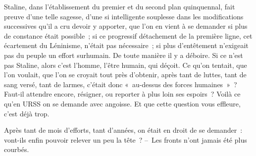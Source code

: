 \documentclass[twoside]{book} %
\newcommand{\astermono}{\medskip\centerline{\color{rubric}\large\selectfont{\syms ✻}}\medskip\par}%
\begin{document}
\astermono

\noindent Staline, dans l’établissement du premier et du second plan quinquennal, fait preuve d’une telle sagesse, d’une si intelligente souplesse dans les modifications successives qu’il a cru devoir y apporter, que l’on en vient à se demander si plus de constance était possible ; si ce progressif détachement de la première ligne, cet écartement du Léninisme, n’était pas nécessaire ; si plus d’entêtement n’exigeait pas du peuple un effort surhumain. De toute manière il y a déboire. Si ce n’est pas Staline, alors c’est l’homme, l’être humain, qui déçoit. Ce qu’on tentait, que l’on voulait, que l’on se croyait tout près d’obtenir, après tant de luttes, tant de sang versé, tant de larmes, c’était donc « au-dessus des forces humaines » ? Faut-il attendre encore, résigner, ou reporter à plus loin ses espoirs ? Voilà ce qu’en URSS on se demande avec angoisse. Et que cette question vous effleure, c’est déjà trop.\par
Après tant de mois d’efforts, tant d’années, on était en droit de se demander : vont-ils enfin pouvoir relever un peu la tête ? – Les fronts n’ont jamais été plus courbés.\par

\astermono
\end{document}
